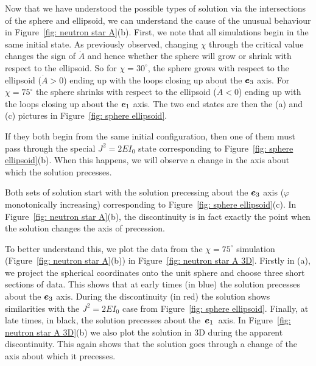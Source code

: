 \documentclass[../full_thesis/full_thesis.tex]{subfiles}
\begin{document}
Now that we have understood the possible types of solution via the intersections
of the sphere and ellipsoid, we can understand the cause of the unusual behaviour
in Figure~\ref{fig: neutron star A}(b). First, we note that
all simulations begin in the same initial state. As previously observed,
changing $\chi$ through the critical value changes the sign of $\dot{A}$ and
hence whether the sphere will grow or shrink with respect to the ellipsoid. So
for $\chi=30^{\circ}$, the sphere grows with respect to the ellipsoid
($\dot{A}>0$) ending up with the loops closing up about the $\boldsymbol{e}_{3}$ axis. For
$\chi=75^{\circ}$ the sphere shrinks with respect to the ellipsoid
($\dot{A}<0$) ending up with the loops closing up about the $\boldsymbol{e}_{1}$ axis. The two
end states are then the (a) and (c) pictures in Figure~\ref{fig: sphere ellipsoid}.

If they both begin from the same initial configuration, then one of them must pass through
the special $J^{2}=2EI_{0}$ state corresponding to Figure~\ref{fig: sphere ellipsoid}(b).
When this happens, we will observe a change in the axis about which the solution
precesses.

Both sets of solution start with the solution precessing about the $\boldsymbol{e}_{3}$ axis
($\varphi$ monotonically increasing) corresponding to Figure~\ref{fig: sphere ellipsoid}(c).
In Figure~\ref{fig: neutron star A}(b), the discontinuity is in fact exactly the point
when the solution changes the axis of precession.

To better understand this, we plot the data from the $\chi=75^{\circ}$
simulation (Figure~\ref{fig: neutron star A}(b)) in Figure~\ref{fig: neutron star A
3D}. Firstly in (a), we project the spherical coordinates onto the unit sphere
and choose three short sections of data. This shows that at early times (in
blue) the solution precesses about the $\boldsymbol{e}_{3}$ axis. During the discontinuity (in
red) the solution shows similarities with the $J^{2}=2EI_{0}$ case from
Figure~\ref{fig: sphere ellipsoid}. Finally, at late times, in black, the
solution precesses about the~$\boldsymbol{e}_{1}$~axis. In Figure~\ref{fig: neutron star A
3D}(b) we also plot the solution in 3D during the apparent discontinuity. This
again shows that the solution goes through a change of the axis about which it
precesses.
\end{document}
